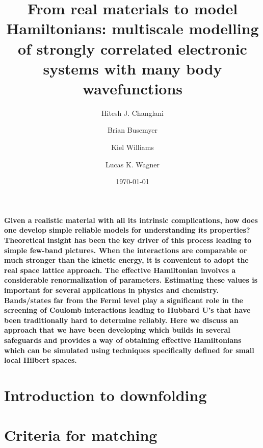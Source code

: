 \documentclass[prl,12pt,onecolumn,nofootinbib,notitlepage,english,superscriptaddress]{revtex4-1}
\begin{document}
\renewcommand{\thefootnote}{\fnsymbol{footnote}}
\renewcommand\abstractname{}
\title{From real materials to model Hamiltonians: multiscale modelling of strongly correlated electronic systems 
       with many body wavefunctions}

\author{Hitesh J. Changlani}
\author{Brian Busemyer}
\author{Kiel Williams}
\author{Lucas K. Wagner}
\date{\today}
\maketitle

\textbf{
Given a realistic material with all its intrinsic complications, how does one develop simple reliable 
models for understanding its properties? Theoretical insight has been the key driver of 
this process leading to simple few-band pictures. When the interactions are comparable or much stronger than 
the kinetic energy, it is convenient to adopt the real space lattice approach. The 
effective Hamiltonian involves a considerable renormalization of parameters. Estimating these values 
is important for several applications in physics and chemistry. Bands/states far from the 
Fermi level play a significant role in the screening of Coulomb interactions leading to Hubbard U's 
that have been traditionally hard to determine reliably. Here we discuss an approach that we 
have been developing which builds in several safeguards and provides a way of obtaining effective Hamiltonians 
which can be simulated using techniques specifically defined for small local Hilbert spaces.
}

\section{Introduction to downfolding}

\section{Criteria for matching}
\end{document}
